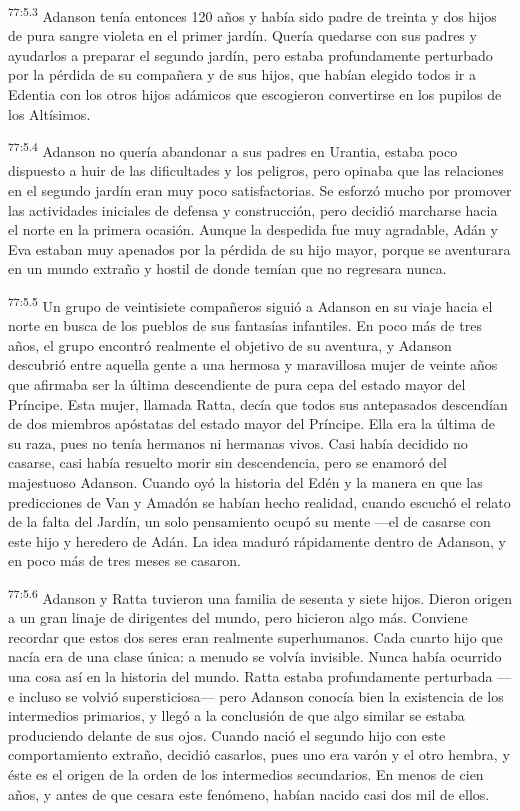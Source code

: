 \par
\textsuperscript{77:5.3} Adanson tenía entonces 120 años y había sido padre de treinta y dos hijos de pura sangre violeta en el primer jardín. Quería quedarse con sus padres y ayudarlos a preparar el segundo jardín, pero estaba profundamente perturbado por la pérdida de su compañera y de sus hijos, que habían elegido todos ir a Edentia con los otros hijos adámicos que escogieron convertirse en los pupilos de los Altísimos.

\par
\textsuperscript{77:5.4} Adanson no quería abandonar a sus padres en Urantia, estaba poco dispuesto a huir de las dificultades y los peligros, pero opinaba que las relaciones en el segundo jardín eran muy poco satisfactorias. Se esforzó mucho por promover las actividades iniciales de defensa y construcción, pero decidió marcharse hacia el norte en la primera ocasión. Aunque la despedida fue muy agradable, Adán y Eva estaban muy apenados por la pérdida de su hijo mayor, porque se aventurara en un mundo extraño y hostil de donde temían que no regresara nunca.

\par
\textsuperscript{77:5.5} Un grupo de veintisiete compañeros siguió a Adanson en su viaje hacia el norte en busca de los pueblos de sus fantasías infantiles. En poco más de tres años, el grupo encontró realmente el objetivo de su aventura, y Adanson descubrió entre aquella gente a una hermosa y maravillosa mujer de veinte años que afirmaba ser la última descendiente de pura cepa del estado mayor del Príncipe. Esta mujer, llamada Ratta, decía que todos sus antepasados descendían de dos miembros apóstatas del estado mayor del Príncipe. Ella era la última de su raza, pues no tenía hermanos ni hermanas vivos. Casi había decidido no casarse, casi había resuelto morir sin descendencia, pero se enamoró del majestuoso Adanson. Cuando oyó la historia del Edén y la manera en que las predicciones de Van y Amadón se habían hecho realidad, cuando escuchó el relato de la falta del Jardín, un solo pensamiento ocupó su mente ---el de casarse con este hijo y heredero de Adán. La idea maduró rápidamente dentro de Adanson, y en poco más de tres meses se casaron.

\par
\textsuperscript{77:5.6} Adanson y Ratta tuvieron una familia de sesenta y siete hijos. Dieron origen a un gran linaje de dirigentes del mundo, pero hicieron algo más. Conviene recordar que estos dos seres eran realmente superhumanos. Cada cuarto hijo que nacía era de una clase única: a menudo se volvía invisible. Nunca había ocurrido una cosa así en la historia del mundo. Ratta estaba profundamente perturbada ---e incluso se volvió supersticiosa--- pero Adanson conocía bien la existencia de los intermedios primarios, y llegó a la conclusión de que algo similar se estaba produciendo delante de sus ojos. Cuando nació el segundo hijo con este comportamiento extraño, decidió casarlos, pues uno era varón y el otro hembra, y éste es el origen de la orden de los intermedios secundarios. En menos de cien años, y antes de que cesara este fenómeno, habían nacido casi dos mil de ellos.

